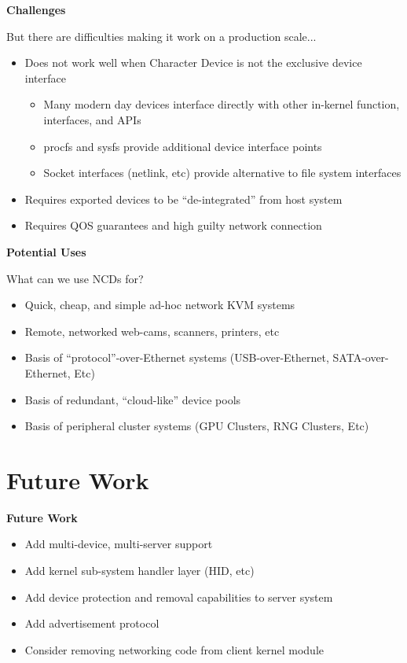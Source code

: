 \documentclass[xcolor=dvipsnames]{beamer}
\begin{document}
\begin{frame}{\bf Challenges}

But there are difficulties making it work on a production scale...

\begin{itemize}
\item Does not work well when Character Device is not the exclusive
  device interface
  \begin{itemize}
  \item Many modern day devices interface directly with other
    in-kernel function, interfaces, and APIs
  \item procfs and sysfs provide additional device interface points
  \item Socket interfaces (netlink, etc) provide alternative to file
    system interfaces
  \end{itemize}
\item Requires exported devices to be ``de-integrated'' from host system
\item Requires QOS guarantees and high guilty network connection
\end{itemize}

\end{frame}

\begin{frame}{\bf Potential Uses}

What can we use NCDs for?

\begin{itemize}
\item Quick, cheap, and simple ad-hoc network KVM systems
\item Remote, networked web-cams, scanners, printers, etc
\item Basis of ``protocol''-over-Ethernet systems (USB-over-Ethernet,
  SATA-over-Ethernet, Etc)
\item Basis of redundant, ``cloud-like'' device pools
\item Basis of peripheral cluster systems (GPU Clusters, RNG Clusters,
  Etc)
\end{itemize}

\end{frame}


\section{Future Work}
\begin{frame}{\bf Future Work}

\begin{itemize}
\item Add multi-device, multi-server support
\item Add kernel sub-system handler layer (HID, etc)
\item Add device protection and removal capabilities to server system
\item Add advertisement protocol
\item Consider removing networking code from client kernel module
\end{itemize}

\end{frame}
\end{document}
